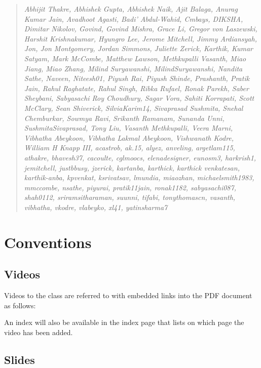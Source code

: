 \begin{quotation}{\em
Abhijit Thakre, Abhishek Gupta, Abhishek Naik, Ajit Balaga, Anurag
Kumar Jain, Avadhoot Agasti, Badi' Abdul-Wahid, Cmbays, DIKSHA,
Dimitar Nikolov, Govind, Govind Mishra, Grace Li, Gregor von
Laszewski, Harshit Krishnakumar, Hyungro Lee, Jerome Mitchell, Jimmy
Ardiansyah, Jon, Jon Montgomery, Jordan Simmons, Juliette Zerick,
Karthik, Kumar Satyam, Mark McCombe, Matthew Lawson, Methkupalli
Vasanth, Miao Jiang, Miao Zhang, Milind Suryawanshi,
MilindSuryawanshi, Nandita Sathe, Naveen, Niteesh01, Piyush Rai,
Piyush Shinde, Prashanth, Pratik Jain, Rahul Raghatate, Rahul Singh,
Ribka Rufael, Ronak Parekh, Saber Sheybani, Sabyasachi Roy Choudhury,
Sagar Vora, Sahiti Korrapati, Scott McClary, Sean Shiverick,
SilviaKarim14, Sivaprasad Sushmita, Snehal Chemburkar, Sowmya Ravi,
Srikanth Ramanam, Sunanda Unni, SushmitaSivaprasad, Tony Liu, Vasanth
Methkupalli, Veera Marni, Vibhatha Abeykoon, Vibhatha Lakmal Abeykoon,
Vishwanath Kodre, William H Knapp III, acastrob, ak.15, alyez,
anveling, argetlam115, athakre, bhavesh37, cacoulte, cglmoocs,
elenadesigner, eunosm3, harkrish1, jemitchell, justbbusy, jzerick,
kartanba, karthick, karthick venkatesan, karthik-anba, kpvenkat,
ksrivatsav, lmundia, miaozhan, michaelsmith1983, mmccombe, nsathe,
piyurai, pratik11jain, ronak1182, sabyasachi087,
shah0112, sriramsitharaman, suunni, tifabi, tonythomascn, vasanth,
vibhatha, vkodre, vlabeyko, xl41, yatinsharma7
}\end{quotation}


\section{Conventions}

\subsection{Videos}

Videos to the class are referred to with embedded links into the PDF
document as follows: 


An index will also be available in the index page
that lists on which page the video has been added.

\subsection{Slides}

